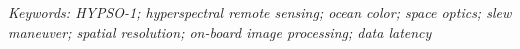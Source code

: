 \documentclass[letterpaper, 10 pt, conference]{ieeeconf}
\begin{document}
\begin{abstract}
\end{abstract}
\textit{Keywords: HYPSO-1; hyperspectral remote sensing; ocean color; space optics; slew maneuver; spatial resolution; on-board image processing; data latency}
\\





% 





\end{document}

